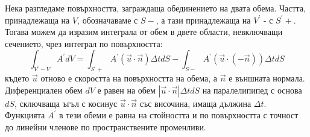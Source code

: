\documentclass[12pt]{article}
\numberwithin{equation}{section}
\begin{document}
Нека разгледаме повърхността, заграждаща обединението на двата обема. Частта, принадлежаща на $V$, обозначаваме с $S-$, а тази принадлежаща на $V^\prime$ - с $S^\prime+$. Тогава можем да изразим интеграла от обем в двете области, невключващи сечението, чрез интеграл по повърхността:
\begin{equation}
    \int_{V^\prime -V}A^\prime dV=\int_{S^\prime+}A^\prime (\vec{u}\cdot\vec{n})\Delta t dS - \int_{S-}A^\prime (\vec{u}\cdot(-\vec{n}))\Delta t dS
\end{equation}
където $\vec{u}$ отново е скоростта на повърхността на обема, а $\vec{n}$ е външната нормала. Диференциален обем $dV$ е равен на обем $|\vec{u}\cdot\vec{n}|\Delta tdS$ на паралелипипед с основа $dS$, сключваща ъгъл с косинус $\vec{u}\cdot\vec{n}$ със височина, имаща дължина $\Delta t$. Функцията $A^\prime$ в тези обеми е равна на стойността и по повърхността с точност до линейни членове по пространствените променливи.
\end{document}
